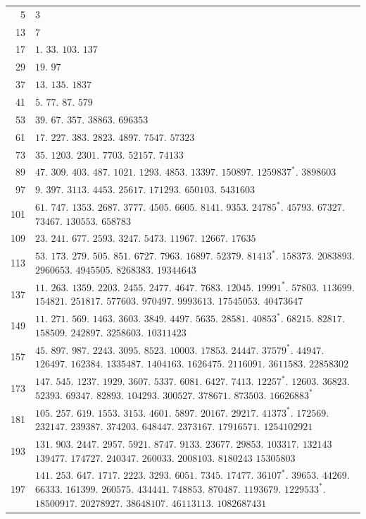 \begin{longtable}{@{}r|p{\dimexpr\linewidth-38pt\relax}@{}}
5 & $3$\\
13 & $7$\\
17 & $1$. $33$. $103$. $137$\\
29 & $19$. $97$\\
37 & $13$. $135$. $1837$\\
41 & $5$. $77$. $87$. $579$\\
53 & $39$. $67$. $357$. $38863$. $696353$\\
61 & $17$. $227$. $383$. $2823$. $4897$. $7547$. $57323$\\
73 & $35$. $1203$. $2301$. $7703$. $52157$. $74133$\\
89 & $47$. $309$. $403$. $487$. $1021$. $1293$. $4853$. $13397$. $150897$. $1259837^{*}$. $3898603$\\
97 & $9$. $397$. $3113$. $4453$. $25617$. $171293$. $650103$. $5431603$\\
101 & $61$. $747$. $1353$. $2687$. $3777$. $4505$. $6605$. $8141$. $9353$. $24785^{*}$. $45793$. $67327$. $73467$. $130553$. $658783$\\
109 & $23$. $241$. $677$. $2593$. $3247$. $5473$. $11967$. $12667$. $17635$\\
113 & $53$. $173$. $279$. $505$. $851$. $6727$. $7963$. $16897$. $52379$. $81413^{*}$. $158373$. $2083893$. $2960653$. $4945505$. $8268383$. $19344643$\\
137 & $11$. $263$. $1359$. $2203$. $2455$. $2477$. $4647$. $7683$. $12045$. $19991^{*}$. $57803$. $113699$. $154821$. $251817$. $577603$. $970497$. $9993613$. $17545053$. $40473647$\\
149 & $11$. $271$. $569$. $1463$. $3603$. $3849$. $4497$. $5635$. $28581$. $40853^{*}$. $68215$. $82817$. $158509$. $242897$. $3258603$. $10311423$\\
157 & $45$. $897$. $987$. $2243$. $3095$. $8523$. $10003$. $17853$. $24447$. $37579^{*}$. $44947$. $126497$. $162384$. $1335487$. $1404163$. $1626475$. $2116091$. $3611583$. $22858302$\\
173 & $147$. $545$. $1237$. $1929$. $3607$. $5337$. $6081$. $6427$. $7413$. $12257^{*}$. $12603$. $36823$. $52393$. $69347$. $82893$. $104293$. $300527$. $378671$. $873503$. $16626883^{*}$\\
181 & $105$. $257$. $619$. $1553$. $3153$. $4601$. $5897$. $20167$. $29217$. $41373^{*}$. $172569$. $232147$. $239387$. $374203$. $648447$. $2373167$. $17916571$. $1254102921$\\
193 & $131$. $903$. $2447$. $2957$. $5921$. $8747$. $9133$. $23677$. $29853$. $103317$. $132143$ $139477$. $174727$. $240347$. $260033$. $2008103$. $8180243$ $15305803$\\
197 & {\raggedright $141$. $253$. $647$. $1717$. $2223$. $3293$. $6051$. $7345$. $17477$. $36107^{*}$. $39653$. $44269$. $66333$. $161399$. $260575$. $434441$. $748853$. $870487$. $1193679$. $1229533^{*}$. $18500917$. $20278927$. $38648107$. $46113113$. $1082687431$\par}\\
\end{longtable}\endgroup
